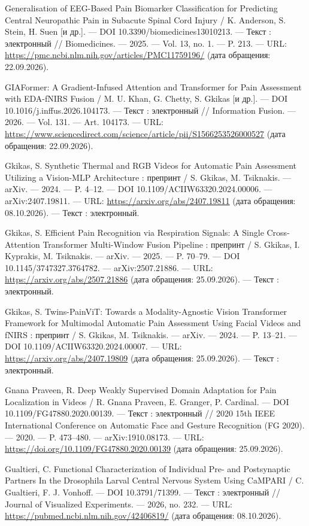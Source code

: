 \begin{list}{}{\setlength{\leftmargin}{10mm}\setlength{\labelwidth}{8mm}\setlength{\labelsep}{2mm}\setlength{\itemsep}{0pt}\setlength{\parsep}{0pt}\setlength{\topsep}{0pt}}
\item[137.] Generalisation of EEG-Based Pain Biomarker Classification for Predicting Central Neuropathic Pain in Subacute Spinal Cord Injury / K. Anderson, S. Stein, H. Suen [и др.]. — DOI 10.3390/biomedicines13010213. — Текст : электронный // Biomedicines. — 2025. — Vol. 13, no. 1. — P. 213. — URL: \url{https://pmc.ncbi.nlm.nih.gov/articles/PMC11759196/} (дата обращения: 22.09.2026).
\item[138.] GIAFormer: A Gradient-Infused Attention and Transformer for Pain Assessment with EDA-fNIRS Fusion / M. U. Khan, G. Chetty, S. Gkikas [и др.]. — DOI 10.1016/j.inffus.2026.104173. — Текст : электронный // Information Fusion. — 2026. — Vol. 131. — Art. 104173. — URL: \url{https://www.sciencedirect.com/science/article/pii/S1566253526000527} (дата обращения: 22.09.2026).
\item[139.] Gkikas, S. Synthetic Thermal and RGB Videos for Automatic Pain Assessment Utilizing a Vision-MLP Architecture : препринт / S. Gkikas, M. Tsiknakis. — arXiv. — 2024. — P. 4–12. — DOI 10.1109/ACIIW63320.2024.00006. — arXiv:2407.19811. — URL: \url{https://arxiv.org/abs/2407.19811} (дата обращения: 08.10.2026). — Текст : электронный.
\item[140.] Gkikas, S. Efficient Pain Recognition via Respiration Signals: A Single Cross-Attention Transformer Multi-Window Fusion Pipeline : препринт / S. Gkikas, I. Kyprakis, M. Tsiknakis. — arXiv. — 2025. — P. 70–79. — DOI 10.1145/3747327.3764782. — arXiv:2507.21886. — URL: \url{https://arxiv.org/abs/2507.21886} (дата обращения: 25.09.2026). — Текст : электронный.
\item[141.] Gkikas, S. Twins-PainViT: Towards a Modality-Agnostic Vision Transformer Framework for Multimodal Automatic Pain Assessment Using Facial Videos and fNIRS : препринт / S. Gkikas, M. Tsiknakis. — arXiv. — 2024. — P. 13–21. — DOI 10.1109/ACIIW63320.2024.00007. — URL: \url{https://arxiv.org/abs/2407.19809} (дата обращения: 25.09.2026). — Текст : электронный.
\item[142.] Gnana Praveen, R. Deep Weakly Supervised Domain Adaptation for Pain Localization in Videos / R. Gnana Praveen, E. Granger, P. Cardinal. — DOI 10.1109/FG47880.2020.00139. — Текст : электронный // 2020 15th IEEE International Conference on Automatic Face and Gesture Recognition (FG 2020). — 2020. — P. 473–480. — arXiv:1910.08173. — URL: \url{https://doi.org/10.1109/FG47880.2020.00139} (дата обращения: 25.09.2026).
\item[143.] Gualtieri, C. Functional Characterization of Individual Pre- and Postsynaptic Partners In the Drosophila Larval Central Nervous System Using CaMPARI / C. Gualtieri, F. J. Vonhoff. — DOI 10.3791/71399. — Текст : электронный // Journal of Visualized Experiments. — 2026, no. 232. — URL: \url{https://pubmed.ncbi.nlm.nih.gov/42406819/} (дата обращения: 08.10.2026).

\end{list}
